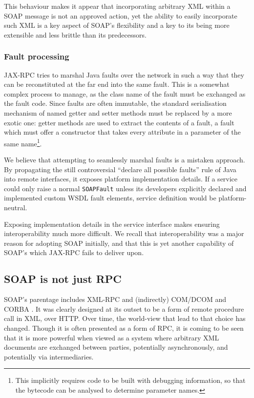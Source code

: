 This behaviour makes it appear that incorporating arbitrary XML within
a SOAP message is not an approved action, yet the ability to easily
incorporate such XML is a key aspect of SOAP's flexibility and a key
to its being more extensible and less brittle than its predecessors.

\subsubsection{Fault processing}
\label{objections:soap-not-rmi:faults}

JAX-RPC tries to marshal Java faults over the network in such a way
that they can be reconstituted at the far end into the same fault.
This is a somewhat complex process to manage, as the class name of the
fault must be exchanged as the fault code. Since faults are often
immutable, the standard serialisation mechanism of named getter and
setter methods must be replaced by a more exotic one: getter methods
are used to extract the contents of a fault, a fault which must offer
a constructor that takes every attribute in a parameter of the same
name\footnote{This implicitly requires code to be built with debugging
information, so that the bytecode can be analysed to determine
parameter names.}.

We believe that attempting to seamlessly marshal faults is a mistaken
approach.  By propagating the still controversial ``declare all
possible faults'' rule of Java into remote interfaces, it exposes
platform implementation details. If a service could only raise a
normal {\tt SOAPFault} unless its developers explicitly declared and
implemented custom WSDL fault elements, service definition would be
platform-neutral.


Exposing implementation details in the service interface makes ensuring
interoperability much more difficult. We recall that interoperability
was a major reason for adopting SOAP initially, and that this is yet
another capability of SOAP's which JAX-RPC fails to deliver upon.

\subsection{SOAP is not just RPC}
\label{objections:soap-not-just-rmi}

SOAP's parentage includes XML-RPC \cite{winer:xmlrpc} and (indirectly)
COM/DCOM and CORBA \cite{dbox:com, vinoski:CORBA}. It was clearly
designed at its outset to be a form of remote procedure call in XML,
over HTTP. Over time, the world-view that lead to that choice has
changed. Though it is often presented as a form of RPC, it is coming
to be seen that it is more powerful when viewed as a system where
arbitrary XML documents are exchanged between parties, potentially
asynchronously, and potentially via intermediaries.

